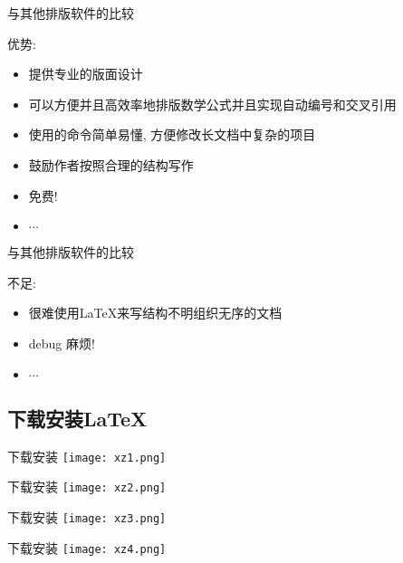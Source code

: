 \documentclass[UTF8]{ctexbeamer}
\begin{document}
\begin{frame}{与其他排版软件的比较}

  优势: 
  \begin{itemize}
  \item
    提供专业的版面设计\pause
  \item
    可以方便并且高效率地排版数学公式并且实现自动编号和交叉引用\pause
  \item
    使用的命令简单易懂, 方便修改长文档中复杂的项目\pause
  \item
	鼓励作者按照合理的结构写作\pause
  \item
	免费!
  \item
	$\cdots$
  \end{itemize}
\end{frame}



\begin{frame}{与其他排版软件的比较}

不足: 
  \begin{itemize}
  \item
    很难使用\LaTeX 来写结构不明组织无序的文档\pause
  \item
    debug 麻烦!
  \item
	$\cdots$
  \end{itemize}
\end{frame}


\subsection{下载安装\LaTeX}

\begin{frame}{下载安装}
\texttt{[image: xz1.png]}

\end{frame}


\begin{frame}{下载安装}
\texttt{[image: xz2.png]}

\end{frame}



\begin{frame}{下载安装}
\texttt{[image: xz3.png]}

\end{frame}


\begin{frame}{下载安装}
\texttt{[image: xz4.png]}

\end{frame}
\end{document}

